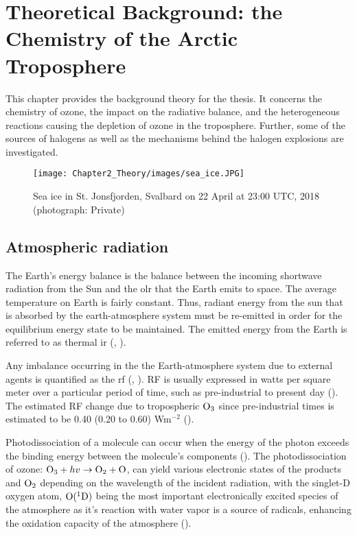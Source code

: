 \setcounter{chapter}{1} 
\chapter{Theoretical Background: the Chemistry of the Arctic Troposphere} \label{ch:theoretical_back}

This chapter provides the background theory for the thesis. It concerns the chemistry of ozone, the impact on the radiative balance, and the heterogeneous reactions causing the depletion of ozone in the troposphere. Further, some of the sources of halogens as well as the mechanisms behind the halogen explosions are investigated. 

\begin{figure}
    \centering
    \texttt{[image: Chapter2\_Theory/images/sea\_ice.JPG]}
    \caption{Sea ice in St. Jonsfjorden, Svalbard on 22 April at 23:00 UTC, 2018 (photograph: Private)}
    \label{fig:sea_ice}
\end{figure}


\section{Atmospheric radiation}\label{sec:atm_rad}

The Earth's energy balance is the balance between the incoming shortwave radiation from the Sun and the \acrfull{olr} that the Earth emits to space. The average temperature on Earth is fairly constant. Thus, radiant energy from the sun that is absorbed by the earth-atmosphere system must be re-emitted in order for the equilibrium energy state to be maintained. The emitted energy from the Earth is referred to as thermal \acrfull{ir} (\cite{Liou_AtmRad}, \cite{SeinfeldSpyros}). 

\medskip

Any imbalance occurring in the the Earth-atmosphere system due to external agents is quantified as the \acrfull{rf} (\cite{IPCCchapter8}, \cite{Bowman2013}). RF is usually expressed in watts per square meter over a particular period of time, such as pre-industrial to present day (\cite{IPCCchapter8}). The estimated RF change due to tropospheric $\mathrm{O_3}$ since pre-industrial times is estimated to be 0.40 (0.20 to 0.60) Wm$^{-2}$ (\cite{IPCCchapter8}). 


\medskip

Photodissociation of a molecule can occur when the energy of the photon exceeds the binding energy between the molecule's components (\cite{SeinfeldSpyros}). The photodissociation of ozone: $\mathrm{O_3} + hv \rightarrow \mathrm{O_2} + \mathrm{O}$, can yield various electronic states of the products  and $\mathrm{O_2}$ depending on the wavelength of the incident radiation, with the singlet-D oxygen atom, $\mathrm{O}(^1\mathrm{D})$ being the most important electronically excited species of the atmosphere as it's reaction with water vapor is a source of  radicals, enhancing the oxidation capacity of the atmosphere (\cite{SeinfeldSpyros}).



